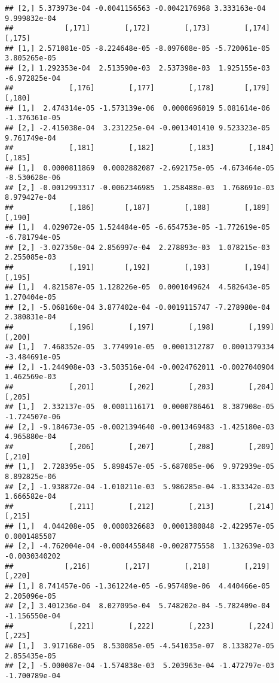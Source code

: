 \documentclass[
]{article}
\begin{document}
\begin{verbatim}
## [2,] 5.373973e-04 -0.0041156563 -0.0042176968 3.333163e-04  9.999832e-04
##            [,171]        [,172]        [,173]        [,174]        [,175]
## [1,] 2.571081e-05 -8.224648e-05 -8.097608e-05 -5.720061e-05  3.805265e-05
## [2,] 1.292353e-04  2.513590e-03  2.537398e-03  1.925155e-03 -6.972825e-04
##             [,176]        [,177]        [,178]       [,179]        [,180]
## [1,]  2.474314e-05 -1.573139e-06  0.0000696019 5.081614e-06 -1.376361e-05
## [2,] -2.415038e-04  3.231225e-04 -0.0013401410 9.523323e-05  9.761749e-04
##             [,181]        [,182]        [,183]        [,184]        [,185]
## [1,]  0.0000811869  0.0002882087 -2.692175e-05 -4.673464e-05 -8.530628e-06
## [2,] -0.0012993317 -0.0062346985  1.258488e-03  1.768691e-03  8.979427e-04
##             [,186]       [,187]        [,188]        [,189]        [,190]
## [1,]  4.029072e-05 1.524484e-05 -6.654753e-05 -1.772619e-05 -6.781794e-05
## [2,] -3.027350e-04 2.856997e-04  2.278893e-03  1.078215e-03  2.255085e-03
##             [,191]       [,192]        [,193]        [,194]       [,195]
## [1,]  4.821587e-05 1.128226e-05  0.0001049624  4.582643e-05 1.270404e-05
## [2,] -5.068160e-04 3.877402e-04 -0.0019115747 -7.278980e-04 2.380831e-04
##             [,196]        [,197]        [,198]        [,199]        [,200]
## [1,]  7.468352e-05  3.774991e-05  0.0001312787  0.0001379334 -3.484691e-05
## [2,] -1.244908e-03 -3.503516e-04 -0.0024762011 -0.0027040904  1.462569e-03
##             [,201]        [,202]        [,203]        [,204]        [,205]
## [1,]  2.332137e-05  0.0001116171  0.0000786461  8.387908e-05 -1.724507e-06
## [2,] -9.184673e-05 -0.0021394640 -0.0013469483 -1.425180e-03  4.965880e-04
##             [,206]        [,207]        [,208]        [,209]       [,210]
## [1,]  2.728395e-05  5.898457e-05 -5.687085e-06  9.972939e-05 8.892825e-06
## [2,] -1.938872e-04 -1.010211e-03  5.986285e-04 -1.833342e-03 1.666582e-04
##             [,211]        [,212]        [,213]        [,214]        [,215]
## [1,]  4.044208e-05  0.0000326683  0.0001380848 -2.422957e-05  0.0001485507
## [2,] -4.762004e-04 -0.0004455848 -0.0028775558  1.132639e-03 -0.0030340202
##            [,216]        [,217]        [,218]        [,219]        [,220]
## [1,] 8.741457e-06 -1.361224e-05 -6.957489e-06  4.440466e-05  2.205096e-05
## [2,] 3.401236e-04  8.027095e-04  5.748202e-04 -5.782409e-04 -1.156550e-04
##             [,221]        [,222]        [,223]        [,224]        [,225]
## [1,]  3.917168e-05  8.530085e-05 -4.541035e-07  8.133827e-05  2.855435e-05
## [2,] -5.000087e-04 -1.574838e-03  5.203963e-04 -1.472797e-03 -1.700789e-04

\end{verbatim}
\end{document}
